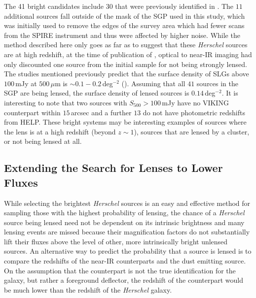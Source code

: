The 41 bright candidates include $30$ that were previously identified in \citealt{Negrello_2017}. The $11$ additional sources fall outside of the mask of the SGP used in this study, which was initially used to remove the edges of the survey area which had fewer scans from the SPIRE instrument and thus were affected by higher noise. While the method described here only goes as far as to suggest that these \textit{Herschel} sources are at high redshift, at the time of publication of \citealt{Negrello_2017}, optical to near-IR imaging had only discounted one source from the initial sample for not being strongly lensed. The studies mentioned previously predict that the surface density of SLGs above $100\,$mJy at $500\,\mu$m is $\sim 0.1 - 0.2\,$deg$^{-2}$ (\citealt{Vieira_2010, Wardlow_2013, Nayyeri_2016}). Assuming that all $41$ sources in the SGP are being lensed, the surface density of lensed sources is $0.14\,$deg$^{-2}$. It is interesting to note that two sources with $S_{500} > 100\,$mJy have no VIKING counterpart within $15\,$arcsec and a further $13$ do not have photometric redshifts from HELP. These bright systems may be interesting examples of sources where the lens is at a high redshift (beyond $z \sim 1$), sources that are lensed by a cluster, or not being lensed at all.

\subsection{Extending the Search for Lenses to Lower Fluxes}

While selecting the brightest \textit{Herschel} sources is an easy and effective method for sampling those with the highest probability of lensing, the chance of a \textit{Herschel} source being lensed need not be dependent on its intrinsic brightness and many lensing events are missed because their magnification factors do not substantially lift their fluxes above the level of other, more intrinsically bright unlensed sources. An alternative way to predict the probability that a source is lensed is to compare the redshifts of the near-IR counterparts and the dust emitting source. On the assumption that the counterpart is not the true identification for the galaxy, but rather a foreground deflector, the redshift of the counterpart would be much lower than the redshift of the \textit{Herschel} galaxy.

